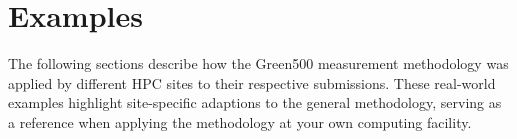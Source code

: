 \chapter{Examples}
\label{sec:examples}

The following sections describe how the Green500 measurement methodology was applied by different HPC sites to their respective submissions.
These real-world examples highlight site-specific adaptions to the general methodology, serving as a reference when applying the methodology at your own computing facility.


